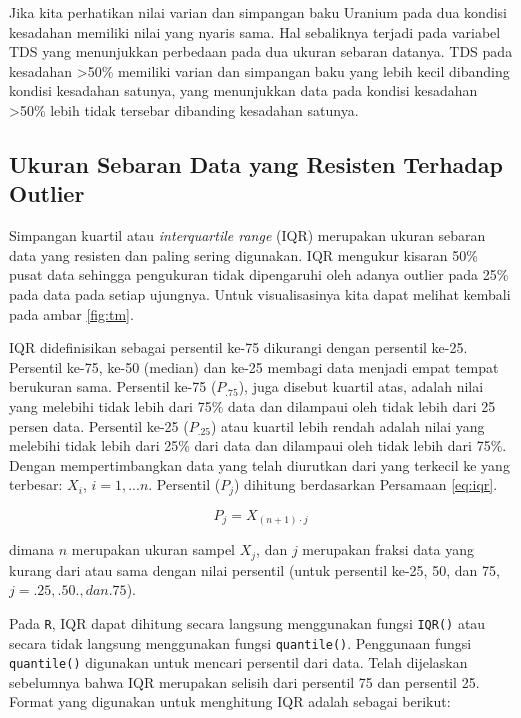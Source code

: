 \documentclass[]{book}
\begin{document}
Jika kita perhatikan nilai varian dan simpangan baku Uranium pada dua
kondisi kesadahan memiliki nilai yang nyaris sama. Hal sebaliknya
terjadi pada variabel TDS yang menunjukkan perbedaan pada dua ukuran
sebaran datanya. TDS pada kesadahan \textgreater{}50\% memiliki varian
dan simpangan baku yang lebih kecil dibanding kondisi kesadahan satunya,
yang menunjukkan data pada kondisi kesadahan \textgreater{}50\% lebih
tidak tersebar dibanding kesadahan satunya.

\subsection{Ukuran Sebaran Data yang Resisten Terhadap
Outlier}\label{ukuran-sebaran-data-yang-resisten-terhadap-outlier}

Simpangan kuartil atau \emph{interquartile range} (IQR) merupakan ukuran
sebaran data yang resisten dan paling sering digunakan. IQR mengukur
kisaran 50\% pusat data sehingga pengukuran tidak dipengaruhi oleh
adanya outlier pada 25\% pada data pada setiap ujungnya. Untuk
visualisasinya kita dapat melihat kembali pada ambar \ref{fig:tm}.

IQR didefinisikan sebagai persentil ke-75 dikurangi dengan persentil
ke-25. Persentil ke-75, ke-50 (median) dan ke-25 membagi data menjadi
empat tempat berukuran sama. Persentil ke-75 (\(P_{.75}\)), juga disebut
kuartil atas, adalah nilai yang melebihi tidak lebih dari 75\% data dan
dilampaui oleh tidak lebih dari 25 persen data. Persentil ke-25
(\(P_{.25}\)) atau kuartil lebih rendah adalah nilai yang melebihi tidak
lebih dari 25\% dari data dan dilampaui oleh tidak lebih dari 75\%.
Dengan mempertimbangkan data yang telah diurutkan dari yang terkecil ke
yang terbesar: \(X_{i}\), \(i=1,...n\). Persentil (\(P_j\)) dihitung
berdasarkan Persamaan \eqref{eq:iqr}.

\begin{equation}
  P_j=X_{\left(n+1\right)\cdot j}
  \label{eq:iqr}
\end{equation}

dimana \(n\) merupakan ukuran sampel \(X_j\), dan \(j\) merupakan fraksi
data yang kurang dari atau sama dengan nilai persentil (untuk persentil
ke-25, 50, dan 75, \(j=.25, .50., dan .75\)).

Pada \texttt{R}, IQR dapat dihitung secara langsung menggunakan fungsi
\texttt{IQR()} atau secara tidak langsung menggunakan fungsi
\texttt{quantile()}. Penggunaan fungsi \texttt{quantile()} digunakan
untuk mencari persentil dari data. Telah dijelaskan sebelumnya bahwa IQR
merupakan selisih dari persentil 75 dan persentil 25. Format yang
digunakan untuk menghitung IQR adalah sebagai berikut:
\end{document}
